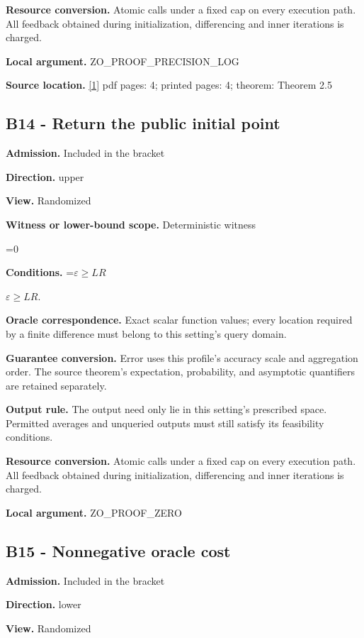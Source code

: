 \documentclass[10pt,a4paper]{article}
\newcommand{\AtlasMath}[1]{\par\begingroup\centering\setbox0=\hbox{$\displaystyle #1$}\ifdim\wd0>1.4\linewidth\typeout{ATLAS WIDE FORMULA: \the\wd0}\fi\ifdim\wd0>\linewidth\resizebox{\linewidth}{!}{\box0}\else\box0\fi\par\endgroup}
\newcommand{\AtlasInlineMath}[1]{\begingroup\setbox0=\hbox{$#1$}\ifdim\wd0>.4\linewidth\endgroup\AtlasMath{#1}\else\endgroup$#1$\fi}
\begin{document}
\textbf{Resource conversion.} Atomic calls under a fixed cap on every execution path. All feedback obtained during initialization, differencing and inner iterations is charged.

\textbf{Local argument.} ZO\_\allowbreak{}PROOF\_\allowbreak{}PRECISION\_\allowbreak{}LOG

\textbf{Source location.} \href{https://arxiv.org/html/2610.00345v1}{[1]} pdf pages: 4; printed pages: 4; theorem: Theorem 2.5

\subsection{B14 - Return the public initial point}
\textbf{Admission.} Included in the bracket

\textbf{Direction.} upper

\textbf{View.} Randomized

\textbf{Witness or lower-bound scope.} Deterministic witness

\AtlasMath{0}
\textbf{Conditions.} \AtlasInlineMath{\varepsilon\ge LR}.

\textbf{Oracle correspondence.} Exact scalar function values; every location required by a finite difference must belong to this setting's query domain.

\textbf{Guarantee conversion.} Error uses this profile's accuracy scale and aggregation order. The source theorem's expectation, probability, and asymptotic quantifiers are retained separately.

\textbf{Output rule.} The output need only lie in this setting's prescribed space. Permitted averages and unqueried outputs must still satisfy its feasibility conditions.

\textbf{Resource conversion.} Atomic calls under a fixed cap on every execution path. All feedback obtained during initialization, differencing and inner iterations is charged.

\textbf{Local argument.} ZO\_\allowbreak{}PROOF\_\allowbreak{}ZERO

\subsection{B15 - Nonnegative oracle cost}
\textbf{Admission.} Included in the bracket

\textbf{Direction.} lower

\textbf{View.} Randomized
\end{document}

